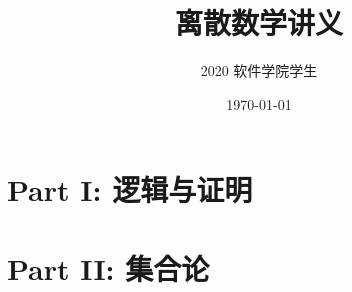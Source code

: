 \documentclass[a4paper, british]{memoir}
\title{离散数学讲义}
\author{2020 软件学院学生}
\date{\today}
\begin{document}
  \frontmatter        %
  \mnfrontpage

  
  

  \cleartorecto
  \tableofcontents    %
  \cleartorecto
  \listoffigures      %
  \cleartorecto
  \listoftables       %

  \mainmatter         %
  
  \part{Part I: 逻辑与证明}
    
    
    
  \part{Part II: 集合论}
  \appendix
  \appendixpage  %

  \backmatter         %
  \printbibliography
\end{document}
